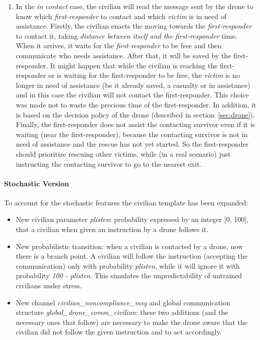 \begin{enumerate}
\begin{enumerate}
		\item In the \textit{in contact} case, the civilian will read the message sent by the drone to know which \textit{first-responder} to contact and which \textit{victim} is in need of assistance. Firstly, the civilian enacts the moving towards the \textit{first-responder} to contact it, taking \textit{distance between itself and the first-responder} time. When it arrives, it waits for the \textit{first-responder} to be free and then communicate who needs assistance. After that, it will be saved by the first-responder.\newline
		It might happen that while the civilian is reaching the first-responder or is waiting for the first-responder to be free, the \textit{victim} is no longer in need of assistance (be it already saved, a casualty or in assistance) and in this case the civilian will not contact the first-responder. This choice was made not to waste the precious time of the first-responder. In addition, it is based on the decision policy of the drone (described in section~\ref{sec:drone}). Finally, the first-responder does not assist the contacting survivor even if it is waiting (near the first-responder), because the contacting survivor is not in need of assistance and the rescue has not yet started. So the first-responder should prioritize rescuing other victims, while (in a real scenario) just instructing the contacting survivor to go to the nearest exit.
	\end{enumerate}
\end{enumerate}


\paragraph{Stochastic Version}
To account for the stochastic features the civilian template has been expanded:
\begin{itemize}
	\item New civilian parameter \textit{plisten}: probability expressed by an integer [0, 100], that a civilian when given an instruction by a drone follows it.
	\item New probabilistic transition: when a civilian is contacted by a drone, now there is a branch point. A civilian will follow the instruction (accepting the communication) only with probability \textit{plisten}, while it will ignore it with probability \textit{100 - plisten}. This simulates the unpredictability of untrained civilians under stress.
	\item New channel \textit{civilian\_noncompliance\_msg} and global communication structure \textit{global\_drone\_comm\_civilian}: these two additions (and the necessary ones that follow) are necessary to make the drone aware that the civilian did not follow the given instruction and to act accordingly.
\end{itemize}
	
